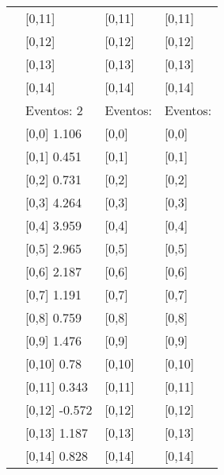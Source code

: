 \begin{table}
\begin{tabular}[t]{llll}
 & {}[0,11] & {}[0,11] & {}[0,11]\\
 & {}[0,12] & {}[0,12] & {}[0,12]\\
\addlinespace
 & {}[0,13] & {}[0,13] & {}[0,13]\\
 & {}[0,14] & {}[0,14] & {}[0,14]\\
 & Eventos:  2 & Eventos: & Eventos:\\
 & {}[0,0] 1.106 & {}[0,0] & {}[0,0]\\
 & {}[0,1] 0.451 & {}[0,1] & {}[0,1]\\
\addlinespace
 & {}[0,2] 0.731 & {}[0,2] & {}[0,2]\\
 & {}[0,3] 4.264 & {}[0,3] & {}[0,3]\\
 & {}[0,4] 3.959 & {}[0,4] & {}[0,4]\\
 & {}[0,5] 2.965 & {}[0,5] & {}[0,5]\\
 & {}[0,6] 2.187 & {}[0,6] & {}[0,6]\\
\addlinespace
1000 & {}[0,7] 1.191 & {}[0,7] & {}[0,7]\\
 & {}[0,8] 0.759 & {}[0,8] & {}[0,8]\\
 & {}[0,9] 1.476 & {}[0,9] & {}[0,9]\\
 & {}[0,10] 0.78 & {}[0,10] & {}[0,10]\\
 & {}[0,11] 0.343 & {}[0,11] & {}[0,11]\\
\addlinespace
 & {}[0,12] -0.572 & {}[0,12] & {}[0,12]\\
 & {}[0,13] 1.187 & {}[0,13] & {}[0,13]\\
 & {}[0,14] 0.828 & {}[0,14] & {}[0,14]\\
\bottomrule
\end{tabular}
\end{table}
